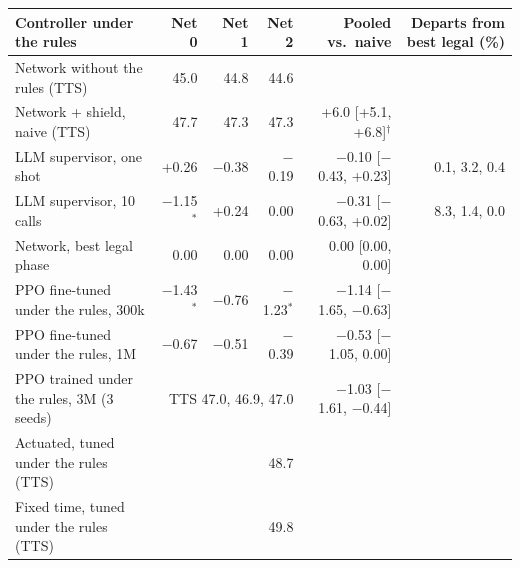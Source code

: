 \begin{tabular}{lrrrrr}
\toprule
Controller under the rules & Net 0 & Net 1 & Net 2 & Pooled vs.\ naive & Departs from best legal (\%) \\
\midrule
Network without the rules (TTS) & 45.0 & 44.8 & 44.6 & & \\
Network + shield, naive (TTS) & 47.7 & 47.3 & 47.3 & +6.0 [+5.1, +6.8]$^{\dagger}$ & \\
\midrule
LLM supervisor, one shot & +0.26 & $-$0.38 & $-$0.19 & $-$0.10 [$-$0.43, +0.23] & 0.1, 3.2, 0.4 \\
LLM supervisor, 10 calls & $-$1.15$^{*}$ & +0.24 & 0.00 & $-$0.31 [$-$0.63, +0.02] & 8.3, 1.4, 0.0 \\
Network, best legal phase & 0.00 & 0.00 & 0.00 & 0.00 [0.00, 0.00] & \\
PPO fine-tuned under the rules, 300k & $-$1.43$^{*}$ & $-$0.76 & $-$1.23$^{*}$ & $-$1.14 [$-$1.65, $-$0.63] & \\
PPO fine-tuned under the rules, 1M & $-$0.67 & $-$0.51 & $-$0.39 & $-$0.53 [$-$1.05, 0.00] & \\
PPO trained under the rules, 3M (3 seeds) & \multicolumn{3}{r}{TTS 47.0, 46.9, 47.0} & $-$1.03 [$-$1.61, $-$0.44] & \\
\midrule
Actuated, tuned under the rules (TTS) & \multicolumn{3}{r}{48.7} & & \\
Fixed time, tuned under the rules (TTS) & \multicolumn{3}{r}{49.8} & & \\
\bottomrule
\end{tabular}
